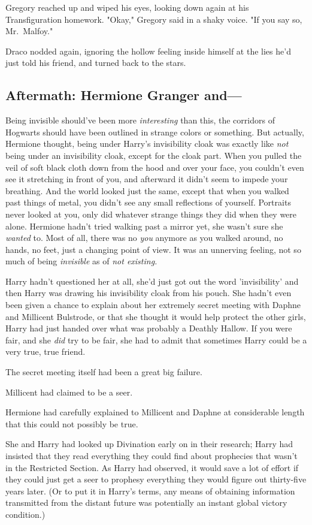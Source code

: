 Gregory reached up and wiped his eyes, looking down again at his 
Transfiguration homework. "Okay," Gregory said in a shaky voice. "If you say 
so, Mr.~Malfoy."

Draco nodded again, ignoring the hollow feeling inside himself at the lies he'd 
just told his friend, and turned back to the stars.
\sbreak
\subsection{Aftermath: Hermione Granger and---}

Being invisible should've been more \emph{interesting} than this, the corridors 
of Hogwarts should have been outlined in strange colors or something. But 
actually, Hermione thought, being under Harry's invisibility cloak was exactly 
like \emph{not} being under an invisibility cloak, except for the cloak part. 
When you pulled the veil of soft black cloth down from the hood and over your 
face, you couldn't even see it stretching in front of you, and afterward it 
didn't seem to impede your breathing. And the world looked just the same, 
except that when you walked past things of metal, you didn't see any small 
reflections of yourself. Portraits never looked at you, only did whatever 
strange things they did when they were alone. Hermione hadn't tried walking 
past a mirror yet, she wasn't sure she \emph{wanted} to. Most of all, there was 
no \emph{you} anymore as you walked around, no hands, no feet, just a changing 
point of view. It was an unnerving feeling, not so much of being 
\emph{invisible} as of \emph{not existing.}

Harry hadn't questioned her at all, she'd just got out the word 'invisibility' 
and then Harry was drawing his invisibility cloak from his pouch. She hadn't 
even been given a chance to explain about her extremely secret meeting with 
Daphne and Millicent Bulstrode, or that she thought it would help protect the 
other girls, Harry had just handed over what was probably a Deathly Hallow. If 
you were fair, and she \emph{did} try to be fair, she had to admit that 
sometimes Harry could be a very true, true friend.

The secret meeting itself had been a great big failure.

Millicent had claimed to be a seer.

Hermione had carefully explained to Millicent and Daphne at considerable length 
that this could not possibly be true.

She and Harry had looked up Divination early on in their research; Harry had 
insisted that they read everything they could find about prophecies that wasn't 
in the Restricted Section. As Harry had observed, it would save a lot of effort 
if they could just get a seer to prophesy everything they would figure out 
thirty-five years later. (Or to put it in Harry's terms, any means of obtaining 
information transmitted from the distant future was potentially an instant 
global victory condition.)

